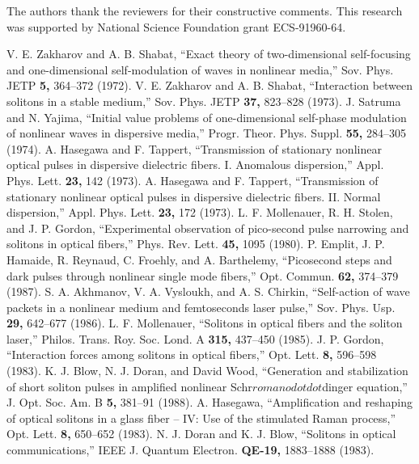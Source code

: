 \acknowledgments

The authors  thank the reviewers for their constructive comments.
This research was supported by National Science Foundation grant
ECS-91960-64.


\begin{references}
V. E. Zakharov and A. B. Shabat, ``Exact theory of two-dimensional
self-focusing and one-dimensional self-modulation of waves in nonlinear
media,'' Sov. Phys. JETP {\bf 5,} 364--372 (1972).
V. E. Zakharov and A. B. Shabat, ``Interaction between solitons in a stable
medium,'' Sov. Phys. JETP {\bf 37,} 823--828 (1973).
J. Satruma and N. Yajima, ``Initial value problems of one-dimensional
self-phase modulation of nonlinear waves in dispersive media,'' Progr.
Theor. Phys. Suppl. {\bf 55,} 284--305 (1974).
A. Hasegawa and F. Tappert, ``Transmission of stationary nonlinear optical
pulses in dispersive dielectric fibers. I. Anomalous dispersion,'' Appl.
Phys. Lett. {\bf 23,} 142 (1973).
A. Hasegawa and F. Tappert, ``Transmission of stationary nonlinear optical
pulses in dispersive dielectric fibers. II. Normal dispersion,'' Appl.
Phys. Lett. {\bf 23,} 172 (1973).
L. F. Mollenauer, R. H. Stolen, and J. P. Gordon, ``Experimental
observation of pico-second pulse narrowing and solitons in optical
fibers,'' Phys. Rev. Lett. {\bf 45,} 1095 (1980).
P. Emplit, J. P. Hamaide, R. Reynaud, C. Froehly, and A. Barthelemy,
``Picosecond steps and dark pulses through nonlinear single mode fibers,''
Opt. Commun. {\bf 62,} 374--379 (1987).
S. A. Akhmanov, V. A. Vysloukh, and A. S. Chirkin, ``Self-action of wave
packets in a nonlinear medium and femtoseconds laser pulse,'' Sov. Phys.
Usp. {\bf 29,} 642--677 (1986).
L. F. Mollenauer, ``Solitons in optical fibers and the soliton laser,''
Philos. Trans. Roy. Soc. Lond. A {\bf 315,} 437--450 (1985).
J. P. Gordon, ``Interaction forces among solitons in optical fibers,'' Opt.
Lett. {\bf 8,} 596--598 (1983).
K. J. Blow, N. J. Doran, and David Wood, ``Generation and stabilization of
short soliton pulses in amplified nonlinear Schr$ roman o dotdot $dinger
equation,'' J. Opt. Soc. Am. B {\bf 5,} 381--91 (1988).
A. Hasegawa, ``Amplification and reshaping of optical solitons in a glass
fiber -- IV: Use of the stimulated Raman process,'' Opt. Lett. {\bf 8,}
650--652 (1983).
N. J. Doran and K. J. Blow, ``Solitons in optical communications,'' IEEE J.
Quantum Electron. {\bf QE-19,} 1883--1888 (1983).

\end{references}
